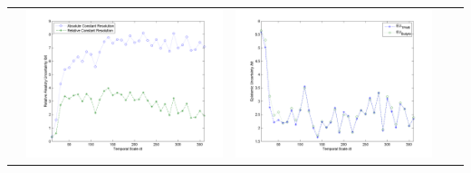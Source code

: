 \documentclass[11pt]{article}
\begin{document}
\begin{table}[H]
{\begin{tabular}{c  c   c   c c }
&\begin{minipage}{.4\textwidth}\includegraphics[width=\linewidth]{resultgraph/13337000AU.png}\end{minipage}
&\begin{minipage}{.4\textwidth}\includegraphics[width=\linewidth]{resultgraph/13337000EU.png}\end{minipage}
\\

\end{tabular}}
\end{table}
\end{document}
